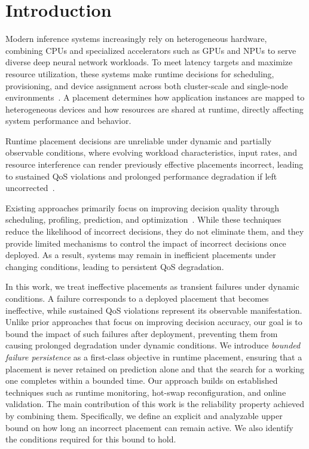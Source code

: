 \documentclass[conference]{IEEEtran}
\begin{document}
\section{Introduction}

Modern inference systems increasingly rely on heterogeneous hardware, combining CPUs and specialized accelerators such as GPUs and NPUs to serve diverse deep neural network workloads.
To meet latency targets and maximize resource utilization, these systems make runtime decisions for scheduling, provisioning, and device assignment across both cluster-scale and single-node environments~\cite{nexus2019sosp, choi_atc2022_spatiotemporal, park_taco2021_slo, inferline2020socc}.
A placement determines how application instances are mapped to heterogeneous devices and how resources are shared at runtime, directly affecting system performance and behavior.

Runtime placement decisions are unreliable under dynamic and partially observable conditions, where evolving workload characteristics, input rates, and resource interference can render previously effective placements incorrect, leading to sustained QoS violations and prolonged performance degradation if left uncorrected~\cite{jeon2019philly, clockwork2020osdi, mendoza_euromlsys2021_interference, kim_iccd2024_interference}.

Existing approaches primarily focus on improving decision quality through scheduling, profiling, prediction, and optimization~\cite{inferline2020socc, shepherd2023nsdi, kim_iccd2024_interference, liu2024heterogeneous_mobile}.
While these techniques reduce the likelihood of incorrect decisions, they do not eliminate them, and they provide limited mechanisms to control the impact of incorrect decisions once deployed.
As a result, systems may remain in inefficient placements under changing conditions, leading to persistent QoS degradation.

In this work, we treat ineffective placements as transient failures under dynamic conditions. 
A failure corresponds to a deployed placement that becomes ineffective, while sustained QoS violations represent its observable manifestation. 
Unlike prior approaches that focus on improving decision accuracy, our goal is to bound the impact of such failures after deployment, preventing them from causing prolonged degradation under dynamic conditions. 
We introduce \emph{bounded failure persistence} as a first-class objective in runtime placement, \textcolor{navyblue}{ensuring that a placement is never retained on prediction alone and that the search for a working one completes within a bounded time.}
Our approach builds on established techniques such as runtime monitoring, hot-swap reconfiguration, and online validation.
%
The main contribution of this work is the reliability property achieved by combining them. Specifically, we define an explicit and analyzable upper bound on how long an incorrect placement can remain active. We also identify the conditions required for this bound to hold.
\end{document}
